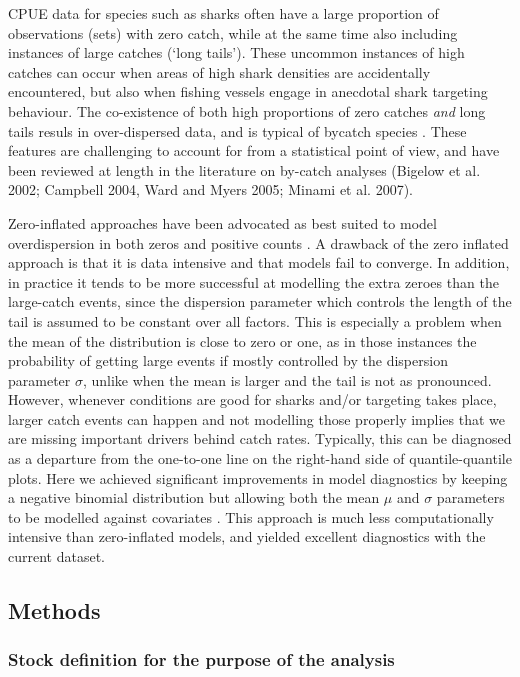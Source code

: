 CPUE data for species such as sharks often have a large proportion of observations (sets) with zero catch, while at the same time also including instances of large catches (`long tails'). These uncommon instances of high catches can occur when areas of high shark densities are accidentally encountered, but also when fishing vessels engage in anecdotal shark targeting behaviour. The co-existence of both high proportions of zero catches \emph{and} long tails resuls in over-dispersed data, and is typical of bycatch species \citep{Ward2005_a}. These features are challenging to account for from a statistical point of view, and have been reviewed at length in the literature on by-catch analyses (Bigelow et al.  2002; Campbell  2004, Ward and Myers  2005; Minami et al. 2007).

Zero-inflated approaches have been advocated as best suited to model overdispersion in both zeros and positive counts \citep{Brodziak_2013_a}. A drawback of the zero inflated approach is that it is data intensive and that models fail to converge. In addition, in practice it tends to be more successful at modelling the extra zeroes than the large-catch events, since the dispersion parameter which controls the length of the tail is assumed to be constant over all factors. This is especially a problem when the mean of the distribution is close to zero or one, as in those instances the probability of getting large events if mostly controlled by the dispersion parameter $\sigma$, unlike when the mean is larger and the tail is not as pronounced. However, whenever conditions are good for sharks and/or targeting takes place, larger catch events can happen and not modelling those properly implies that we are missing important drivers behind catch rates. Typically, this can be diagnosed as a departure from the one-to-one line on the right-hand side of quantile-quantile plots. Here we achieved significant improvements in model diagnostics by keeping a negative binomial distribution but allowing both the mean $\mu$ and $\sigma$ parameters to be modelled against covariates \citep{GAMLSSXXXX}. This approach is much less computationally intensive than zero-inflated models, and yielded excellent diagnostics with the current dataset.


 \subsection{Methods}
 \label{cpuemeth:datafilter}
 \subsubsection{Stock definition for the purpose of the analysis}
   
